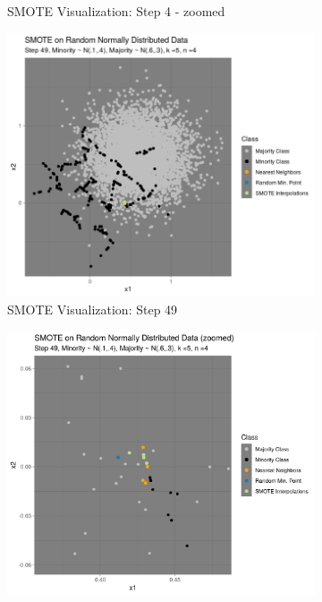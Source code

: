 \documentclass[12pt,a4paper]{article}
\begin{document}
\begin{figure}[]
\begin{subfigure}{0.48\textwidth}
\caption{SMOTE Visualization: Step 4 - zoomed} \label{fig:a}
\end{subfigure}
\medskip
\begin{subfigure}{0.48\textwidth}
\includegraphics[width=\linewidth]{./graphics/knn049.png}
\caption{SMOTE Visualization: Step 49} \label{fig:a}
\end{subfigure}\hspace*{\fill}
\begin{subfigure}{0.48\textwidth}
\includegraphics[width=\linewidth]{./graphics/knn_zoom049.png}

\end{subfigure}
\end{figure}
\end{document}
